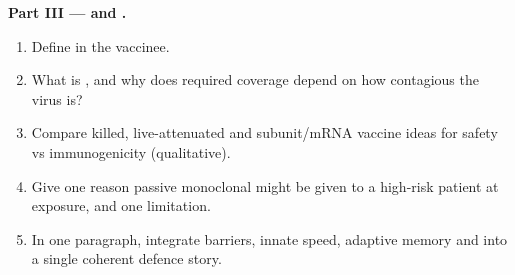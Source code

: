 \begin{problem}
\medskip
\noindent\textbf{Part III ---  and .}
\begin{enumerate}[resume]
  \item Define  in the vaccinee.
  \item What is , and why does required coverage depend on
        how contagious the virus is?
  \item Compare killed, live-attenuated and subunit/mRNA vaccine ideas
        for safety vs immunogenicity (qualitative).
  \item Give one reason passive monoclonal  might be given to
        a high-risk patient at exposure, and one limitation.
  \item In one paragraph, integrate barriers, innate speed, adaptive
        memory and  into a single coherent defence story.
\end{enumerate}
\end{problem}

